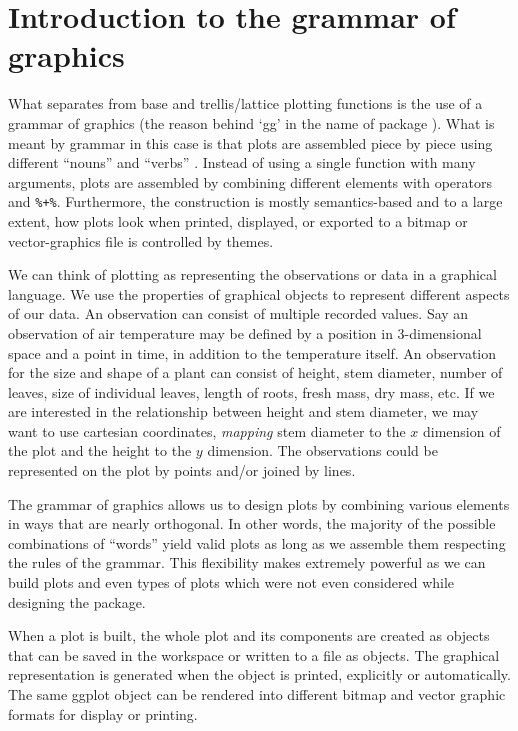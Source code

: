 \documentclass[krantz2]{krantz}\usepackage{knitr}
\begin{document}
\section{Introduction to the grammar of graphics}
What separates \ggplot from base \Rlang and trellis/lattice plotting functions is the use of a grammar of graphics (the reason behind `gg' in the name of package ). What is meant by grammar in this case is that plots are assembled piece by piece using different ``nouns'' and ``verbs'' \autocite{Cleveland1985}. Instead of using a single function with many arguments, plots are assembled by combining different elements with operators \code{+} and \verb|%+%|. Furthermore, the construction is mostly semantics-based and to a large extent, how plots look when printed, displayed, or exported to a bitmap or vector-graphics file is controlled by themes.

We can think of plotting as representing the observations or data in a graphical language. We use the properties of graphical objects to represent different aspects of our data. An observation can consist of multiple recorded values. Say an observation of air temperature may be defined by a position in 3-dimensional space and a point in time, in addition to the temperature itself. An observation for the size and shape of a plant can consist of height, stem diameter, number of leaves, size of individual leaves, length of roots, fresh mass, dry mass, etc. If we are interested in the relationship between height and stem diameter, we may want to use cartesian coordinates, \emph{mapping} stem diameter to the $x$ dimension of the plot and the height to the $y$ dimension. The observations could be represented on the plot by points and/or joined by lines.

The grammar of graphics allows us to design plots by combining various elements in ways that are nearly orthogonal. In other words, the majority of the possible combinations of ``words'' yield valid plots as long as we assemble them respecting the rules of the grammar. This flexibility makes \ggplot extremely powerful as we can build plots and even types of plots which were not even considered while designing the \ggplot package.

When a plot is built, the whole plot and its components are created as \Rlang objects that can be saved in the workspace or written to a file as objects. The graphical representation is generated when the object is printed, explicitly or automatically. The same ggplot object can be rendered into different bitmap and vector graphic formats for display or printing.
\end{document}
